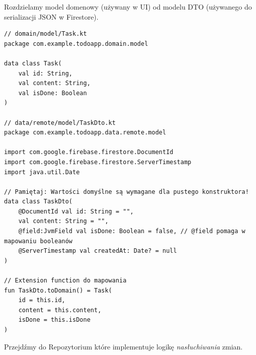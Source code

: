Rozdzielamy model domenowy (używany w UI) od modelu DTO (używanego do serializacji JSON w Firestore).

\begin{verbatim}
// domain/model/Task.kt
package com.example.todoapp.domain.model

data class Task(
    val id: String,
    val content: String,
    val isDone: Boolean
)

// data/remote/model/TaskDto.kt
package com.example.todoapp.data.remote.model

import com.google.firebase.firestore.DocumentId
import com.google.firebase.firestore.ServerTimestamp
import java.util.Date

// Pamiętaj: Wartości domyślne są wymagane dla pustego konstruktora!
data class TaskDto(
    @DocumentId val id: String = "",
    val content: String = "",
    @field:JvmField val isDone: Boolean = false, // @field pomaga w mapowaniu booleanów
    @ServerTimestamp val createdAt: Date? = null
)

// Extension function do mapowania
fun TaskDto.toDomain() = Task(
    id = this.id,
    content = this.content,
    isDone = this.isDone
)
\end{verbatim}


Przejdźmy do Repozytorium które implementuje logikę \textit{nasłuchiwania} zmian.

